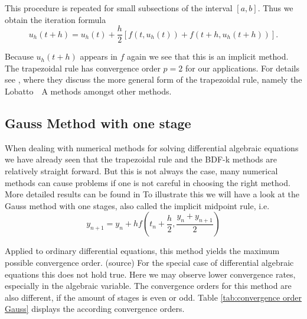 	This procedure is repeated for small subsections of the interval $[a,b]$. Thus we obtain the iteration formula
	\begin{displaymath}
		u_h (t+h) = u_h(t) +\frac{h}{2}[f(t,u_h(t)) + f(t+h, u_h(t+h))].
	\end{displaymath}
%	
	
	Because $u_h(t+h)$ appears in $f$ again we see that this is an implicit method. %
	The trapezoidal rule has convergence order $p=2$ for our applications. For details see \cite{HairerErnst1989Tnso}, where they discuss the more general form of the trapezoidal rule, namely the Lobatto~~A methods amongst other methods.
	
	
\subsection{Gauss Method with one stage}

	When dealing with numerical methods for solving differential algebraic equations we have already seen that the trapezoidal rule and the BDF-k methods are relatively straight forward. But this is not always the case, many numerical methods can cause problems if one is not careful in choosing the right method. More detailed results can be found in \cite{HairerErnst1989Tnso}
	To illustrate this we will have a look at the Gauss method with one stages, also called the implicit midpoint rule, i.e.
	\begin{displaymath}
		y_{n+1} = y_n + h f(t_n + \frac{h}{2}, \frac{y_n + y_{n+1}}{2})
	\end{displaymath}

	Applied to ordinary differential equations, this method yields the maximum possible convergence order. (source) For the special case of differential algebraic equations this does not hold true. Here we may observe lower convergence rates, especially in the algebraic variable. The convergence orders for this method are also different, if the amount of stages is even or odd. Table \ref{tab:convergence order Gauss} displays the according convergence orders.
	
